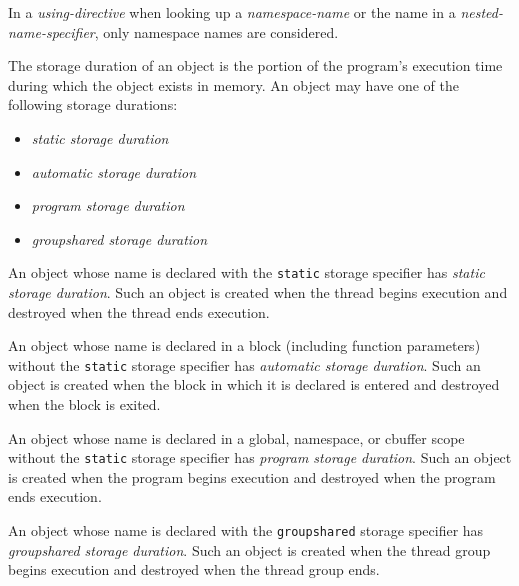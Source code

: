 
\p In a \textit{using-directive} when looking up a \textit{namespace-name} or
the name in a \textit{nested-name-specifier}, only namespace names are
considered.


\p The storage duration of an object is the portion of the program's execution
time during which the object exists in memory. An object may have one of the
following storage durations:
\begin{itemize}
\item \textit{static storage duration}
\item \textit{automatic storage duration}
\item \textit{program storage duration}
\item \textit{groupshared storage duration}
\end{itemize}


\p An object whose name is declared with the \texttt{static} storage specifier
has \textit{static storage duration}. Such an object is created when the thread
begins execution and destroyed when the thread ends execution.


\p An object whose name is declared in a block (including function parameters)
without the \texttt{static} storage specifier has \textit{automatic storage
duration}. Such an object is created when the block in which it is declared is
entered and destroyed when the block is exited.


\p An object whose name is declared in a global, namespace, or cbuffer scope
without the \texttt{static} storage specifier has \textit{program storage
duration}. Such an object is created when the program begins execution and
destroyed when the program ends execution.


\p An object whose name is declared with the \texttt{groupshared} storage
specifier has \textit{groupshared storage duration}. Such an object is created
when the thread group begins execution and destroyed when the thread group ends.


